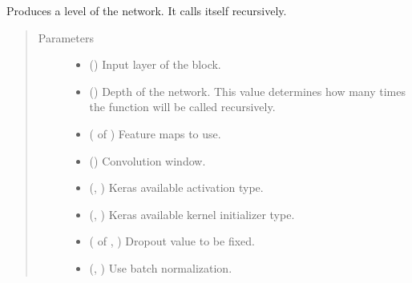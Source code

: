 \documentclass[letterpaper,10pt,english]{sphinxmanual}
\begin{document}
\begin{fulllineitems}
\label{\detokenize{models/resunet:models.resunet.level_block}}
Produces a level of the network. It calls itself recursively.
\begin{quote}\begin{description}
\item[{Parameters}] \leavevmode\begin{itemize}
\item {} 
 () \textendash{} Input layer of the block.

\item {} 
 () \textendash{} Depth of the network. This value determines how many times the function will be called recursively.

\item {} 
 ( of ) \textendash{} Feature maps to use.

\item {} 
 () \textendash{} Convolution window.

\item {} 
 (, ) \textendash{} Keras available activation type.

\item {} 
 (, ) \textendash{} Keras available kernel initializer type.

\item {} 
 ( of , ) \textendash{} Dropout value to be fixed.

\item {} 
 (, ) \textendash{} Use batch normalization.


\end{itemize}
\end{description}
\end{quote}
\end{fulllineitems}
\end{document}
